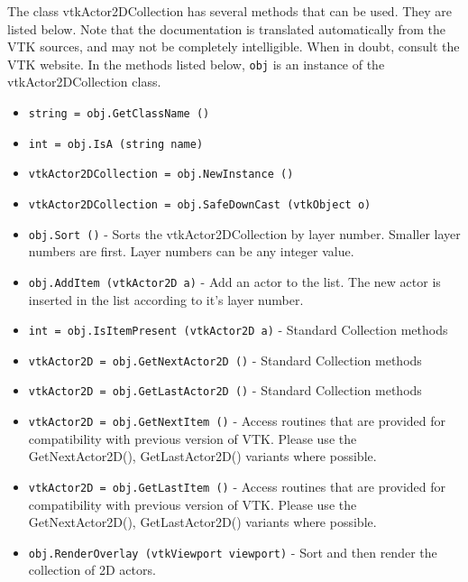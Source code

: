 The class vtkActor2DCollection has several methods that can be used.
  They are listed below.
Note that the documentation is translated automatically from the VTK sources,
and may not be completely intelligible.  When in doubt, consult the VTK website.
In the methods listed below, \verb|obj| is an instance of the vtkActor2DCollection class.
\begin{itemize}
\item  \verb|string = obj.GetClassName ()|

\item  \verb|int = obj.IsA (string name)|

\item  \verb|vtkActor2DCollection = obj.NewInstance ()|

\item  \verb|vtkActor2DCollection = obj.SafeDownCast (vtkObject o)|

\item  \verb|obj.Sort ()| -  Sorts the vtkActor2DCollection by layer number.  Smaller layer
 numbers are first.  Layer numbers can be any integer value.

\item  \verb|obj.AddItem (vtkActor2D a)| -  Add an actor to the list.  The new actor is inserted in the list
 according to it's layer number.

\item  \verb|int = obj.IsItemPresent (vtkActor2D a)| -  Standard Collection methods

\item  \verb|vtkActor2D = obj.GetNextActor2D ()| -  Standard Collection methods

\item  \verb|vtkActor2D = obj.GetLastActor2D ()| -  Standard Collection methods

\item  \verb|vtkActor2D = obj.GetNextItem ()| -  Access routines that are provided for compatibility with previous
 version of VTK.  Please use the GetNextActor2D(), GetLastActor2D()
 variants where possible.

\item  \verb|vtkActor2D = obj.GetLastItem ()| -  Access routines that are provided for compatibility with previous
 version of VTK.  Please use the GetNextActor2D(), GetLastActor2D()
 variants where possible.

\item  \verb|obj.RenderOverlay (vtkViewport viewport)| -  Sort and then render the collection of 2D actors.  

\end{itemize}
